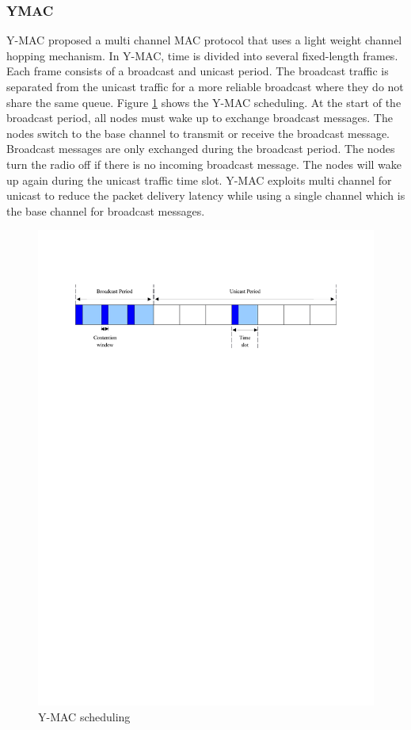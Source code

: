 
\subsubsection{YMAC}
Y-MAC \cite{y-mac} proposed a multi channel MAC protocol that uses a light weight channel hopping mechanism. In Y-MAC, time is divided into several fixed-length frames. Each frame consists of a broadcast and unicast period. The broadcast traffic is separated from the unicast traffic for a more reliable broadcast where they do not share the same queue. Figure \ref{fig_ymac} shows the Y-MAC scheduling. At the start of the broadcast period, all nodes must wake up to exchange broadcast messages. The nodes switch to the base channel to transmit or receive the broadcast message. Broadcast messages are only exchanged during the broadcast period. The nodes turn the radio off if there is no incoming broadcast message. The nodes will wake up again during the unicast traffic time slot. Y-MAC exploits multi channel for unicast to reduce the packet delivery latency while using a single channel which is the base channel for broadcast messages.

\begin{figure}
\centering
\includegraphics[trim=2cm 22cm 2cm 3cm, clip=true, totalheight=0.17\textheight]{ymac.pdf}
\caption{Y-MAC scheduling}
\label{fig_ymac}
\end{figure}

